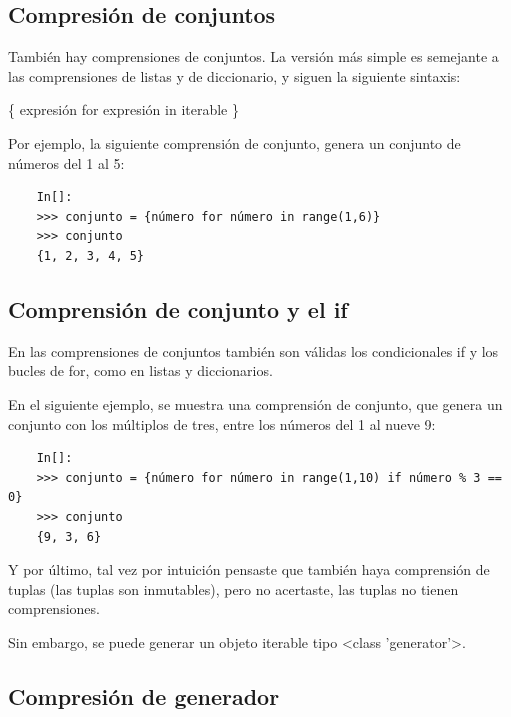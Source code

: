 \subsection{Compresión de conjuntos}\label{conjuntosC} 

También hay comprensiones de conjuntos. La versión más simple es semejante a las comprensiones de listas  y de diccionario, y siguen la siguiente sintaxis:

\begin{center}
	\{ expresión{ } {\ttfamily for} { } expresión { } {\ttfamily in} { } iterable \} 
\end{center}

Por ejemplo, la siguiente comprensión de conjunto, genera un conjunto de números del 1 al 5: 
\begin{lstlisting}
	In[]:	
	>>> conjunto = {número for número in range(1,6)}
	>>> conjunto
	{1, 2, 3, 4, 5}
\end{lstlisting}



\subsection*{Comprensión de conjunto y el {\ttfamily if} }
En las comprensiones de conjuntos también son válidas los condicionales  {\ttfamily if} y los bucles de  {\ttfamily for}, como en listas y diccionarios.

En el siguiente ejemplo,  se muestra una comprensión de conjunto, que genera un conjunto con los múltiplos de tres, entre los números del 1 al nueve 9:  
\begin{lstlisting}
	In[]:	
	>>> conjunto = {número for número in range(1,10) if número % 3 == 0}
	>>> conjunto
	{9, 3, 6}
\end{lstlisting}



Y por último, tal vez por intuición pensaste que también haya comprensión de tuplas (las tuplas son inmutables), pero no acertaste, las tuplas no tienen comprensiones.

Sin embargo, se puede generar un objeto iterable tipo {\ttfamily  <class {}'{}generator{}'{}>{}}.



\subsection{Compresión de generador}\label{compresionG} 

